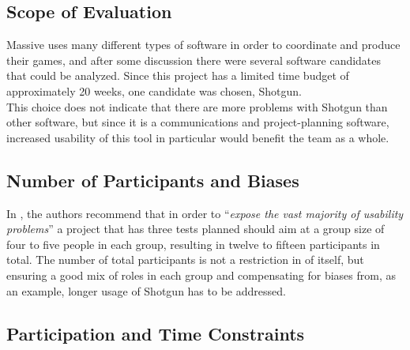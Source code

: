 \documentclass[10pt]{article}
\newcommand{\myenquote}[1]{\enquote{\itshape#1}}
\begin{document}
  \subsection{Scope of Evaluation}

    Massive uses many different types of software in order to coordinate and
    produce their games, and after some discussion there were several software
    candidates that could be analyzed. Since this project has a limited time
    budget of approximately 20 weeks, one candidate was chosen, Shotgun. \\

    This choice does not indicate that there are more problems with Shotgun
    than other software, but since it is a communications and project-planning
    software, increased usability of this tool in particular would benefit the
    team as a whole.


  \subsection{Number of Participants and Biases}

    In \cite[p.126]{c_handbook_usability}, the
    authors recommend that in order to \myenquote{expose the vast majority of
      usability problems} a project that has three tests planned should aim at
    a group size of four to five people in each group, resulting in twelve
    to fifteen participants in total. The number of total participants is not a
    restriction in of itself, but ensuring a good mix of roles in each group
    and compensating for biases from, as an example, longer usage of Shotgun
    has to be addressed.


  \subsection{Participation and Time Constraints}
\end{document}
